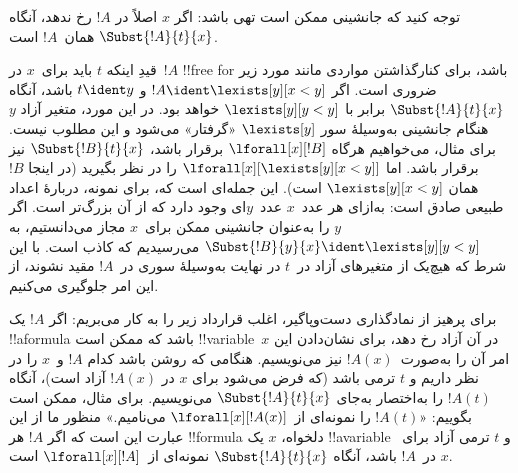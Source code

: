 \documentclass[../../../include/open-logic-section]{subfiles}
\begin{document}
\begin{explain}
توجه کنید که جانشینی ممکن است تهی باشد: اگر $x$ اصلاً در $!A$
رخ ندهد، آنگاه $\Subst{!A}{t}{x}$ همان~$!A$ است.

قیدِ اینکه $t$ باید برای~$x$ در~$!A$ !!{free for} باشد، برای
کنارگذاشتن مواردی مانند مورد زیر ضروری است. اگر
$!A \ident \lexists[y][x < y]$ و $t \ident y$ باشد، آنگاه
$\Subst{!A}{t}{x}$ برابر با $\lexists[y][y < y]$ خواهد بود. در این
مورد، متغیر آزاد $y$ هنگام جانشینی به‌وسیلهٔ سور $\lexists[y]$
«گرفتار» می‌شود و این مطلوب نیست. برای مثال، می‌خواهیم هرگاه
$\lforall[x][!B]$ برقرار باشد، $\Subst{!B}{t}{x}$ نیز برقرار باشد.
اما $\lforall[x][\lexists[y][x < y]]$ را در نظر بگیرید (در اینجا
$!B$ همان $\lexists[y][x < y]$ است). این جمله‌ای است که، برای نمونه،
دربارهٔ اعداد طبیعی صادق است: به‌ازای هر عدد~$x$ عدد~$y$ای وجود دارد
که از آن بزرگ‌تر است. اگر $y$ را به‌عنوان جانشینی ممکن برای~$x$
مجاز می‌دانستیم، به $\Subst{!B}{y}{x} \ident \lexists[y][y < y]$
می‌رسیدیم که کاذب است. با این شرط که هیچ‌یک از متغیرهای آزاد در~$t$
در نهایت به‌وسیلهٔ سوری در~$!A$ مقید نشوند، از این امر جلوگیری می‌کنیم.
\end{explain}

برای پرهیز از نمادگذاری دست‌وپاگیر، اغلب قرارداد زیر را به کار می‌بریم:
اگر $!A$ یک !!a{formula} باشد که ممکن است !!{variable}~$x$ در آن
آزاد رخ دهد، برای نشان‌دادن این امر آن را به‌صورت~$!A(x)$ نیز می‌نویسیم.
هنگامی که روشن باشد کدام $!A$ و~$x$ را در نظر داریم و $t$ ترمی باشد
(که فرض می‌شود برای $x$ در $!A(x)$ آزاد است)، آنگاه $!A(t)$ را
به‌اختصار به‌جای $\Subst{!A}{t}{x}$ می‌نویسیم. برای مثال، ممکن است
بگوییم: «$!A(t)$ را نمونه‌ای از~$\lforall[x][!A(x)]$ می‌نامیم.»
منظور ما از این عبارت این است که اگر $!A$ هر !!{formula} دلخواه،
$x$ یک !!a{variable} و $t$ ترمی آزاد برای~$x$ در~$!A$ باشد، آنگاه
$\Subst{!A}{t}{x}$ نمونه‌ای از~$\lforall[x][!A]$ است.
\end{document}
